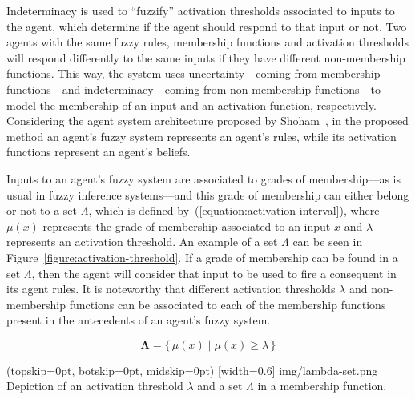 \documentclass{ieeeaccess}
\begin{document}
Indeterminacy is used to ``fuzzify'' activation thresholds associated to inputs
to the agent, which determine if the agent should respond to that
input or not. Two agents with the same fuzzy rules, membership
functions and activation thresholds will respond differently to the
same inputs if they have different non-membership functions. This way,
the system uses uncertainty---coming from membership functions---and
indeterminacy---coming from non-membership functions---to model the
membership of an input and an activation function,
respectively. Considering the agent system architecture proposed by
Shoham~\cite{Shoham1993}, in the proposed method an agent's fuzzy system
represents an agent's rules, while its activation functions represent an
agent's beliefs.

Inputs to an agent's fuzzy system are associated to grades of
membership---as is usual in fuzzy inference systems---and this grade
of membership can either belong or not to a set $\Lambda$, which is
defined by~(\ref{equation:activation-interval}), where $\mu(x)$
represents the grade of membership associated to an input $x$ and
$\lambda$ represents an activation threshold. An example of a set
$\Lambda$ can be seen in Figure~\ref{figure:activation-threshold}. If
a grade of membership can be found in a set $\Lambda$, then the agent
will consider that input to be used to fire a consequent in its agent
rules. It is noteworthy that different activation thresholds $\lambda$
and non-membership functions can be associated to each of the
membership functions present in the antecedents of an agent's fuzzy
system.

\begin{equation}
  \label{equation:activation-interval}
  \bm{\Lambda} = \{\,\mu(x) \mid \mu(x) \geq \lambda \,\}
\end{equation}

\Figure[](topskip=0pt, botskip=0pt, midskip=0pt)
[width=0.6\linewidth]
{img/lambda-set.png}
{Depiction of an activation threshold $\lambda$ and a set $\Lambda$ in a membership function.
  \label{figure:activation-threshold}}
\end{document}

